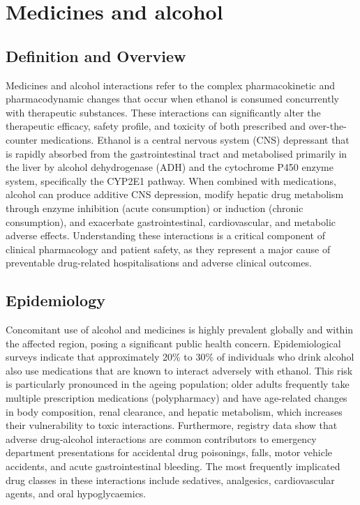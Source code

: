 \chapter{Medicines and alcohol}

\section*{Definition and Overview}
Medicines and alcohol interactions refer to the complex pharmacokinetic and pharmacodynamic changes that occur when ethanol is consumed concurrently with therapeutic substances. These interactions can significantly alter the therapeutic efficacy, safety profile, and toxicity of both prescribed and over-the-counter medications. Ethanol is a central nervous system (CNS) depressant that is rapidly absorbed from the gastrointestinal tract and metabolised primarily in the liver by alcohol dehydrogenase (ADH) and the cytochrome P450 enzyme system, specifically the CYP2E1 pathway. When combined with medications, alcohol can produce additive CNS depression, modify hepatic drug metabolism through enzyme inhibition (acute consumption) or induction (chronic consumption), and exacerbate gastrointestinal, cardiovascular, and metabolic adverse effects. Understanding these interactions is a critical component of clinical pharmacology and patient safety, as they represent a major cause of preventable drug-related hospitalisations and adverse clinical outcomes.

\section*{Epidemiology}
Concomitant use of alcohol and medicines is highly prevalent globally and within the affected region, posing a significant public health concern. Epidemiological surveys indicate that approximately 20\% to 30\% of individuals who drink alcohol also use medications that are known to interact adversely with ethanol. This risk is particularly pronounced in the ageing population; older adults frequently take multiple prescription medications (polypharmacy) and have age-related changes in body composition, renal clearance, and hepatic metabolism, which increases their vulnerability to toxic interactions. Furthermore, registry data show that adverse drug-alcohol interactions are common contributors to emergency department presentations for accidental drug poisonings, falls, motor vehicle accidents, and acute gastrointestinal bleeding. The most frequently implicated drug classes in these interactions include sedatives, analgesics, cardiovascular agents, and oral hypoglycaemics.

